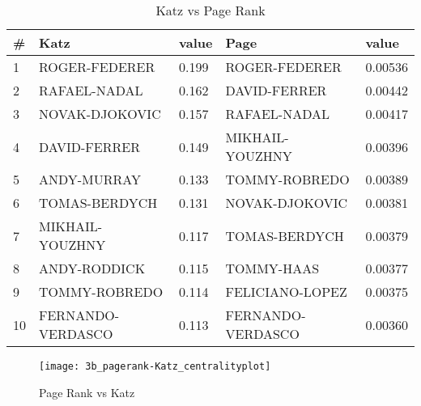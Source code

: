 \documentclass[runningheads]{llncs}
\begin{document}
\begin{table}
\centering
\caption{Katz vs Page Rank}\label{tab_katz_vs_page}
\begin{tabular}{|l|l|l|l|l|}
\hline
\# & Katz & value & Page & value \\ \hline
1 & ROGER-FEDERER & 0.199 & ROGER-FEDERER & 0.00536 \\ \hline
2 & RAFAEL-NADAL & 0.162 & DAVID-FERRER & 0.00442 \\ \hline
3 & NOVAK-DJOKOVIC & 0.157 & RAFAEL-NADAL & 0.00417 \\ \hline
4 & DAVID-FERRER & 0.149 & MIKHAIL-YOUZHNY & 0.00396 \\ \hline
5 & ANDY-MURRAY & 0.133 & TOMMY-ROBREDO & 0.00389 \\ \hline
6 & TOMAS-BERDYCH & 0.131 & NOVAK-DJOKOVIC & 0.00381 \\ \hline
7 & MIKHAIL-YOUZHNY & 0.117 & TOMAS-BERDYCH & 0.00379 \\ \hline
8 & ANDY-RODDICK & 0.115 & TOMMY-HAAS & 0.00377 \\ \hline
9 & TOMMY-ROBREDO & 0.114 & FELICIANO-LOPEZ & 0.00375 \\ \hline
10 & FERNANDO-VERDASCO & 0.113 & FERNANDO-VERDASCO & 0.00360 \\ \hline

\end{tabular}
\end{table}


\begin{figure}
\centering
\texttt{[image: 3b\_pagerank-Katz\_centralityplot]}
\caption{Page Rank vs Katz} \label{fig_3a_page_katz_plot}
\end{figure}
\end{document}
